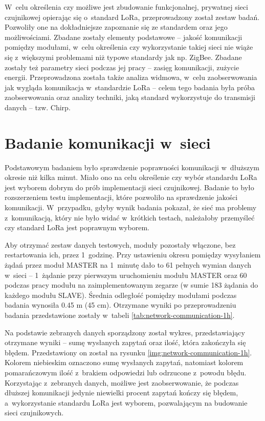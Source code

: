 W~celu określenia czy możliwe jest zbudowanie funkcjonalnej, prywatnej sieci czujnikowej opierając się o~standard LoRa,
przeprowadzony został zestaw badań. Pozwoliły one na dokładniejsze zapoznanie się ze standardem oraz jego możliwościami.
Zbadane zostały elementy podstawowe -- jakość komunikacji pomiędzy modułami, w~celu określenia czy wykorzystanie takiej
sieci nie wiąże się z~większymi problemami niż typowe standardy jak np. ZigBee. Zbadane zostały też parametry sieci
podczas jej pracy -- zasięg komunikacji, zużycie energii. Przeprowadzona została także analiza widmowa, w~celu
zaobserwowania jak wygląda komunikacja w~standardzie LoRa -- celem tego badania była próba zaobserwowania oraz analizy
techniki, jaką standard wykorzystuje do transmisji danych -- tzw. Chirp.

\section{\label{sect:network-comm}Badanie komunikacji w~sieci} Podstawowym badaniem było sprawdzenie poprawności
komunikacji w~dłuższym okresie niż kilka minut. Miało ono na celu określenie czy wybór standardu LoRa jest wyborem
dobrym do prób implementacji sieci czujnikowej. Badanie to było rozszerzeniem testu implementacji, które pozwoliło na
sprawdzenie jakości komunikacji. W~przypadku, gdyby wynik badania pokazał, że sieć ma problemy z~komunikacją, który nie
było widać w~krótkich testach, należałoby przemyśleć czy standard LoRa jest poprawnym wyborem.

Aby otrzymać zestaw danych testowych, moduły pozostały włączone, bez restartowania ich, przez 1~godzinę. Przy ustawieniu
okresu pomiędzy wysyłaniem żądań przez moduł MASTER na 1~minutę dało to 61 pełnych wymian danych w~sieci -- 1~żądanie
przy pierwszym uruchomieniu modułu MASTER oraz 60 podczas pracy modułu na zaimplementowanym zegarze (w sumie 183 żądania
do każdego modułu SLAVE). Średnia odległość pomiędzy modułami podczas badania wynosiła 0.45 m (45 cm). Otrzymane wyniki po
przeprowadzeniu badania przedstawione zostały w~tabeli \ref{tab:network-communication-1h}.



\FloatBarrier
Na podstawie zebranych danych sporządzony został wykres, przedstawiający otrzymane wyniki  -- sumę wysłanych zapytań
oraz ilość, która zakończyła się błędem. Przedstawiony on został na rysunku \ref{img:network-communication-1h}. Kolorem
niebieskim oznaczono sumę wysłanych zapytań, natomiast kolorem pomarańczowym ilość z~brakiem odpowiedzi lub odrzucone
z~powodu błędu. Korzystając z~zebranych danych, możliwe jest zaobserwowanie, że podczas dłuższej komunikacji jedynie
niewielki procent zapytań kończy się błędem, a~wykorzystanie standardu LoRa jest wyborem, pozwalającym na budowanie
sieci czujnikowych.

